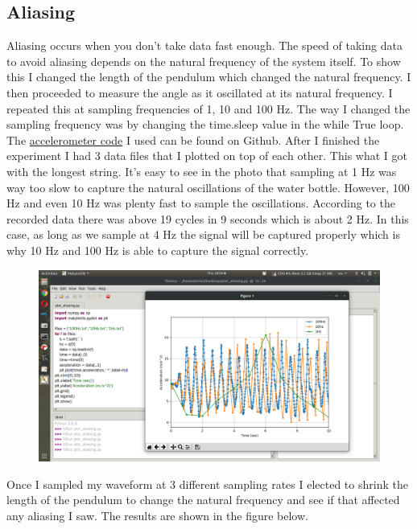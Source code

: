 \subsection{Aliasing}
Aliasing occurs when you don't take data fast enough. The speed of taking data to avoid aliasing depends on the natural frequency of the system itself. To show this I changed the length of the pendulum which changed the natural frequency. I then proceeded to measure the angle as it oscillated at its natural frequency. I repeated this at sampling frequencies of 1, 10 and 100 Hz. The way I changed the sampling frequency was by changing the time.sleep value in the while True loop. The \href{https://github.com/cmontalvo251/Microcontrollers/blob/master/Circuit_Playground/CircuitPython/Accelerometer/low_level_accel.py}{accelerometer code} I used can be found on Github. After I finished the experiment I had 3 data files that I plotted on top of each other. This what I got with the longest string. It’s easy to see in the photo that sampling at 1 Hz was way too slow to capture the natural oscillations of the water bottle. However, 100 Hz and even 10 Hz was plenty fast to sample the oscillations. According to the recorded data there was above 19 cycles in 9 seconds which is about 2 Hz. In this case, as long as we sample at 4 Hz the signal will be captured properly which is why 10 Hz and 100 Hz is able to capture the signal correctly.
\begin{figure}[H]
  \begin{center}
    \includegraphics[width=\textwidth]{Figures/aliasing.png}
  \end{center}
\end{figure}
Once I sampled my waveform at 3 different sampling rates I elected to shrink the length of the pendulum to change the natural frequency and see if that affected any aliasing I saw. The results are shown in the figure below.
